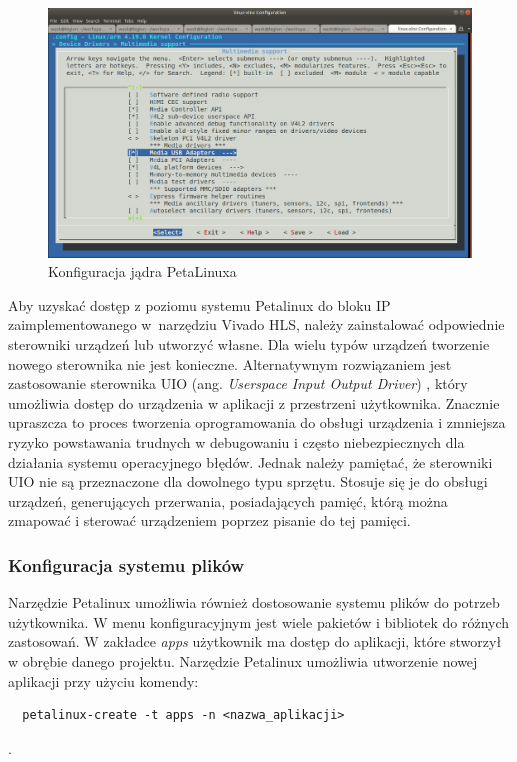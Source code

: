 \begin{figure}[!h]
  \centering
  \includegraphics[width=\textwidth]{img/petalinux-config-kernel.png}
  \caption{Konfiguracja jądra PetaLinuxa}
  \label{petalinux-config-kernel}
\end{figure}

Aby uzyskać dostęp z poziomu systemu Petalinux do bloku IP zaimplementowanego w~narzędziu Vivado HLS, należy 
zainstalować odpowiednie sterowniki urządzeń lub utworzyć własne. Dla wielu typów urządzeń tworzenie nowego sterownika 
nie jest konieczne. Alternatywnym rozwiązaniem jest zastosowanie sterownika UIO (ang. \emph{Userspace Input Output 
Driver}) \cite{uio-drivers}, który umożliwia dostęp do urządzenia w aplikacji z przestrzeni użytkownika. Znacznie 
upraszcza to proces tworzenia oprogramowania do obsługi urządzenia i zmniejsza ryzyko powstawania trudnych w 
debugowaniu i często niebezpiecznych dla działania systemu operacyjnego błędów. Jednak należy pamiętać, że sterowniki 
UIO nie są przeznaczone dla dowolnego typu sprzętu. Stosuje się je do obsługi urządzeń, generujących przerwania, 
posiadających pamięć, którą można zmapować i sterować urządzeniem poprzez pisanie do tej pamięci. 

\subsubsection{Konfiguracja systemu plików}

Narzędzie Petalinux umożliwia również dostosowanie systemu plików do potrzeb użytkownika. W menu konfiguracyjnym jest 
wiele pakietów i bibliotek do różnych zastosowań. W zakładce \emph{apps} użytkownik ma dostęp do aplikacji, które 
stworzył w obrębie danego projektu. Narzędzie Petalinux umożliwia utworzenie nowej aplikacji przy użyciu komendy:
\begin{verbatim}
  petalinux-create -t apps -n <nazwa_aplikacji>
\end{verbatim}.

